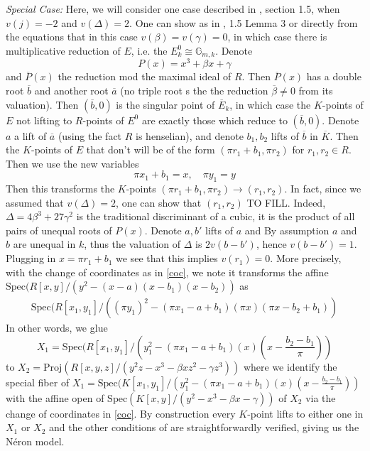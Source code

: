 \documentclass{article}
\theoremstyle{definition}
\theoremstyle{remark}
\theoremstyle{plain}
\newcommand{\mb}[1]{\mathbb{#1}}
\begin{document}
\textit{Special Case:}\label{special-case} Here, we will consider one case described in \cite{BLR}, section 1.5, when $v(j) = -2$ and $v(\Delta) = 2$.
One can show as in \cite{BLR}, 1.5 Lemma 3 or directly from the equations that in this case $v(\beta) = v(\gamma) = 0$, in which case there is multiplicative reduction of $E$, i.e. the $E^0_k \cong \mb{G}_{m,k}$.
Denote
\[P(x) = x^3 + \beta x + \gamma\]
and $\overline{P}(x)$ the reduction mod the maximal ideal of $R$.
Then $\overline{P}(x)$ has a double root $\overline{b}$ and another root $\overline{a}$ (no triple root s the the reduction $\overline{\beta} \neq 0$ from its valuation).
Then $(\overline{b}, 0)$ is the singular point of $\overline{E}_k$, in which case the $K$-points of $E$ not lifting to $R$-points of $E^0$ are exactly those which reduce to $(\overline{b}, 0)$.
\newline
Denote $a$ a lift of $\overline{a}$ (using the fact $R$ is henselian), and denote $b_1, b_2$ lifts of $\overline{b}$ in $\overline{K}$.
Then the $K$-points of $E$ that don't  will be of the form $(\pi r_1 + b_1, \pi r_2)$ for $r_1, r_2 \in R$.
Then we use the new variables 
\begin{equation}\label{coc}
\pi x_1 + b_1 = x , \quad \pi y_1 = y
\end{equation}
Then this transforms the $K$-points $(\pi r_1 + b_1, \pi r_2) \to (r_1, r_2)$.
In fact, since we assumed that $v(\Delta) = 2$, one can show that $(r_1, r_2)$ TO FILL.
Indeed, $\Delta = 4\beta^3 + 27 \gamma^2$ is the traditional discriminant of a cubic, it is the product of all pairs of unequal roots of $P(x)$.
Denote $a,b'$ lifts of $a$ and
By assumption $a$ and $b$ are unequal in $k$, thus the valuation of $\Delta$ is $2v(b - b')$, hence $v(b - b') = 1$.
Plugging in $x = \pi r_1 + b_1$ we see that this implies $v(r_1) = 0$.
More precisely, with the change of coordinates as in \ref{coc}, we note it transforms the affine $\text{Spec}(R[x,y]/(y^2 - (x - a)(x-b_1)(x-b_2))$ as 
\begin{align*}
	\text{Spec}(R[x_1,y_1]/( (\pi y_1)^2 - (\pi x_1 - a + b_1)(\pi x)(\pi x-b_2 + b_1))
\end{align*}
In other words, we glue 
\[X_1 = \text{Spec}(R[x_1, y_1]/(y_1^2  - (\pi x_1 - a + b_1)(x)(x - \frac{b_2 - b_1}{\pi}))\]
to $X_2 = \text{Proj}(R[x,y,z]/(y^2z - x^3 - \beta x z^2 - \gamma z^3))$ where we identify the special fiber of $X_1 = \text{Spec}(K[x_1, y_1]/(y_1^2  - (\pi x_1 - a + b_1)(x)(x - \frac{b_2 - b_1}{\pi}))$ with the affine open of $\text{Spec}(K[x, y]/(y^2 - x^3 - \beta x - \gamma))$ of $X_2$ via the change of coordinates in \ref{coc}.
By construction every $K$-point lifts to either one in $X_1$ or $X_2$ and the other conditions of  are straightforwardly verified, giving us the N\'eron model. 
\indent 
\end{document}
